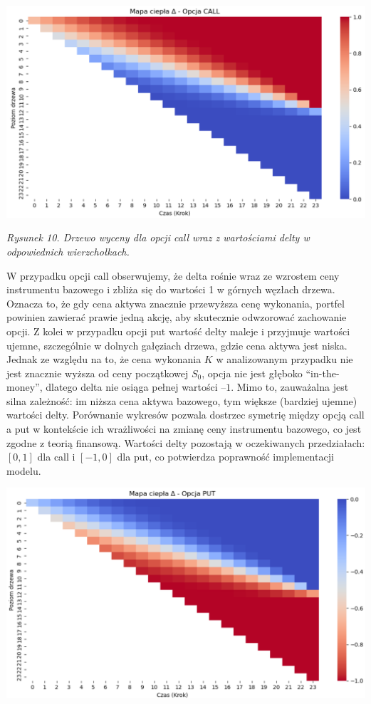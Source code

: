 \documentclass[
]{article}
\begin{document}
\begin{center}\includegraphics[width=0.75\linewidth]{wykresy/wykres_delta_call} \end{center}

\emph{Rysunek 10. Drzewo wyceny dla opcji call wraz z wartościami delty
w odpowiednich wierzchołkach.}

W przypadku opcji call obserwujemy, że delta rośnie wraz ze wzrostem
ceny instrumentu bazowego i zbliża się do wartości 1 w górnych węzłach
drzewa. Oznacza to, że gdy cena aktywa znacznie przewyższa cenę
wykonania, portfel powinien zawierać prawie jedną akcję, aby skutecznie
odwzorować zachowanie opcji. Z kolei w przypadku opcji put wartość delty
maleje i przyjmuje wartości ujemne, szczególnie w dolnych gałęziach
drzewa, gdzie cena aktywa jest niska. Jednak ze względu na to, że cena
wykonania \(K\) w analizowanym przypadku nie jest znacznie wyższa od
ceny początkowej \(S_{0}\), opcja nie jest głęboko ``in-the-money'',
dlatego delta nie osiąga pełnej wartości \(–1\). Mimo to, zauważalna
jest silna zależność: im niższa cena aktywa bazowego, tym większe
(bardziej ujemne) wartości delty. Porównanie wykresów pozwala dostrzec
symetrię między opcją call a put w kontekście ich wrażliwości na zmianę
ceny instrumentu bazowego, co jest zgodne z teorią finansową. Wartości
delty pozostają w oczekiwanych przedziałach: \([0,1]\) dla call i
\([-1,0]\) dla put, co potwierdza poprawność implementacji modelu.

\begin{center}\includegraphics[width=0.75\linewidth]{wykresy/wykres_delta_put} \end{center}
\end{document}

